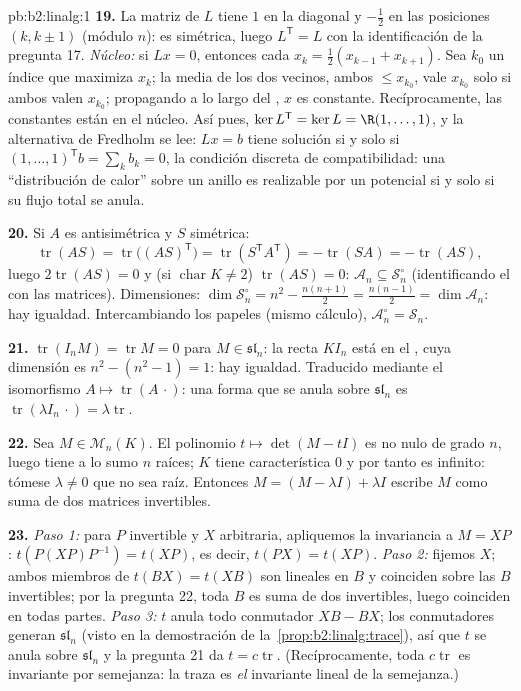 \begin{solution}{pb:b2:linalg:1}
\textbf{19.} La matriz de $L$ tiene $1$ en la diagonal y
$-\frac12$ en las posiciones $(k, k\pm1)$ (módulo $n$): es
simétrica, luego $L^{\mathsf T} = L$ con la identificación de la
pregunta 17. \emph{Núcleo:} si $Lx = 0$, entonces cada $x_k =
\frac12(x_{k-1} + x_{k+1})$. Sea $k_0$ un índice que maximiza
$x_k$; la media de los dos vecinos, ambos $\leq x_{k_0}$, vale
$x_{k_0}$ solo si ambos valen $x_{k_0}$; propagando a lo largo del
, $x$ es constante. Recíprocamente, las constantes están
en el núcleo. Así pues, $\ker L^{\mathsf T} = \ker L = \R(1,
\dots, 1)$, y la alternativa de Fredholm se lee: $Lx = b$ tiene
solución si y solo si $(1,\dots,1)^{\mathsf T} b = \sum_k b_k =
0$, la condición discreta de compatibilidad: una ``distribución de
calor'' sobre un anillo es realizable por un potencial si y solo
si su flujo total se anula.

\textbf{20.} Si $A$ es antisimétrica y $S$ simétrica:
\[
\operatorname{tr}(AS) = \operatorname{tr}\bigl((AS)^{\mathsf
T}\bigr) = \operatorname{tr}(S^{\mathsf T}A^{\mathsf T}) =
-\operatorname{tr}(SA) = -\operatorname{tr}(AS),
\]
luego $2\operatorname{tr}(AS) = 0$ y (si $\operatorname{char} K
\neq 2$) $\operatorname{tr}(AS) = 0$: $\mathcal{A}_n \subseteq
\mathcal{S}_n^\circ$ (identificando el  con las matrices).
Dimensiones: $\dim\mathcal{S}_n^\circ = n^2 - \frac{n(n+1)}2 =
\frac{n(n-1)}2 = \dim\mathcal{A}_n$: hay igualdad. Intercambiando
los papeles (mismo cálculo), $\mathcal{A}_n^\circ =
\mathcal{S}_n$.

\textbf{21.} $\operatorname{tr}(I_nM) = \operatorname{tr} M = 0$
para $M \in \mathfrak{sl}_n$: la recta $KI_n$ está en el
, cuya dimensión es $n^2 - (n^2 - 1) = 1$: hay igualdad.
Traducido mediante el isomorfismo $A \mapsto
\operatorname{tr}(A\,\cdot)$: una forma que se anula sobre
$\mathfrak{sl}_n$ es $\operatorname{tr}(\lambda I_n\,\cdot) =
\lambda\operatorname{tr}$.

\textbf{22.} Sea $M \in \mathcal{M}_n(K)$. El polinomio $t \mapsto
\det(M - tI)$ es no nulo de grado $n$, luego tiene a lo sumo $n$
raíces; $K$ tiene característica $0$ y por tanto es infinito:
tómese $\lambda \neq 0$ que no sea raíz. Entonces $M = (M -
\lambda I) + \lambda I$ escribe $M$ como suma de dos matrices
invertibles.

\textbf{23.} \emph{Paso 1:} para $P$ invertible y $X$ arbitraria,
apliquemos la invariancia a $M = XP$: $t(P(XP)P^{-1}) = t(XP)$, es
decir, $t(PX) = t(XP)$. \emph{Paso 2:} fijemos $X$; ambos miembros
de $t(BX) = t(XB)$ son lineales en $B$ y coinciden sobre las $B$
invertibles; por la pregunta 22, toda $B$ es suma de dos
invertibles, luego coinciden en todas partes. \emph{Paso 3:} $t$
anula todo conmutador $XB - BX$; los conmutadores generan
$\mathfrak{sl}_n$ (visto en la demostración de la~\cref{prop:b2:linalg:trace}), así que $t$ se anula sobre
$\mathfrak{sl}_n$ y la pregunta 21 da $t = c\operatorname{tr}$.
(Recíprocamente, toda $c\operatorname{tr}$ es invariante por
semejanza: la traza es \emph{el} invariante lineal de la
semejanza.)


\end{solution}
